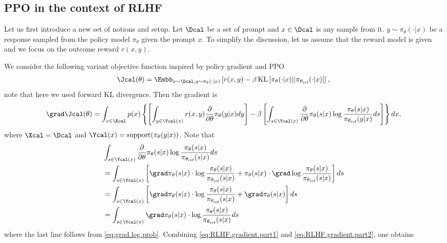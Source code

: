 \subsection{PPO in the context of RLHF}
Let us first introduce a new set of notions and setup. Let $\Dcal$ be a set of prompt and $x\in\Dcal$ is any sample from it. $y\sim \pi_{\theta}(\cdot|x)$ be a response sampled from the policy model $\pi_{\theta}$ given the prompt $x$. To simplify the discussion, let us assume that the reward model is given and we focus on the outcome reward $r(x,y)$. 

We consider the following variant objective function inspired by policy gradient and PPO
\begin{align*}
   \Jcal(\theta) = \Embb_{x\sim \Dcal, y\sim\pi_{\theta}(\cdot|x)} \left[ r(x,y) - \beta \operatorname{KL}\left[\pi_{\theta}(\cdot|x) || \pi_{\theta_{\text{ref}}}(\cdot|x)\right]\right],
\end{align*}
note that here we used forward KL divergence.
Then the gradient is 
\begin{align}\label{eq:RLHF.gradient.part1}
\grad \Jcal(\theta) = \int_{x\in \Xcal} p(x)\left\{\left[\int_{y\in\Ycal(x)}r(x,y)\frac{\partial}{\partial \theta}\pi_{\theta}(y|x)dy\right] - \beta \left[\int_{s\in\Ycal(x)}\frac{\partial}{\partial\theta}\pi_{\theta}(s|x)\log\frac{\pi_{\theta}(s|x)}{\pi_{\theta_{\text{ref}}}(y|x)}ds\right] \right\}dx,
\end{align}
where $\Xcal=\Dcal$ and $\Ycal(x)=\text{support}(\pi_{\theta}(y|x))$.
Note that
\begin{align}
    & \int_{s\in\Ycal(x)}\frac{\partial}{\partial\theta}\pi_{\theta}(s|x)\log\frac{\pi_{\theta}(s|x)}{\pi_{\theta_{\text{ref}}}(s|x)}ds  \nonumber\\
    & =  \int_{s\in\Ycal(x)}\left[\grad\pi_{\theta}(s|x)\cdot\log\frac{\pi_{\theta}(s|x)}{\pi_{\theta_{\text{ref}}}(s|x)} + \pi_{\theta}(s|x)\cdot \grad\log\frac{\pi_{\theta}(s|x)}{\pi_{\theta_{\text{ref}}}(s|x)}\right]ds \nonumber\\
    & = \int_{s\in\Ycal(x)}\left[\grad\pi_{\theta}(s|x)\cdot\log\frac{\pi_{\theta}(s|x)}{\pi_{\theta_{\text{ref}}}(s|x)} + \grad \pi_{\theta}(s|x)\right]ds \nonumber\\
    & = \int_{s\in\Ycal(x)}\grad\pi_{\theta}(s|x)\cdot\log\frac{\pi_{\theta}(s|x)}{\pi_{\theta_{\text{ref}}}(s|x)} ds \label{eq:RLHF.gradient.part2}
\end{align}  
where the last line follows from \eqref{eq:grad.log.prob}. Combining \eqref{eq:RLHF.gradient.part1} and \eqref{eq:RLHF.gradient.part2}, one obtains
